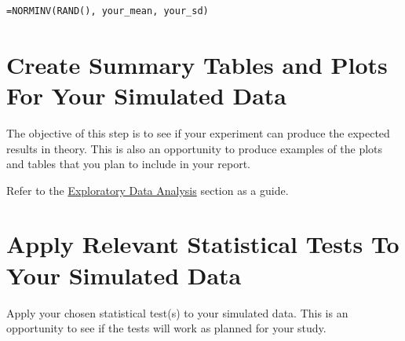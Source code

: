 \documentclass[
]{book}
\begin{document}
\begin{verbatim}
=NORMINV(RAND(), your_mean, your_sd)
\end{verbatim}

\section{Create Summary Tables and Plots For Your Simulated Data}\label{create-summary-tables-and-plots-for-your-simulated-data}

The objective of this step is to see if your experiment can produce the expected results in theory. This is also an opportunity to produce examples of the plots and tables that you plan to include in your report.

Refer to the \hyperref[eda]{Exploratory Data Analysis} section as a guide.

\section{Apply Relevant Statistical Tests To Your Simulated Data}\label{apply-relevant-statistical-tests-to-your-simulated-data}

Apply your chosen statistical test(s) to your simulated data. This is an opportunity to see if the tests will work as planned for your study.


\end{document}
